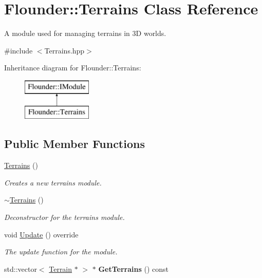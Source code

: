 \hypertarget{class_flounder_1_1_terrains}{}\section{Flounder\+:\+:Terrains Class Reference}
\label{class_flounder_1_1_terrains}


A module used for managing terrains in 3D worlds.  




{\ttfamily \#include $<$Terrains.\+hpp$>$}

Inheritance diagram for Flounder\+:\+:Terrains\+:\begin{figure}[H]
\begin{center}
\leavevmode
\includegraphics[height=2.000000cm]{class_flounder_1_1_terrains}
\end{center}
\end{figure}
\subsection*{Public Member Functions}
\begin{DoxyCompactItemize}
\item 
\hyperlink{class_flounder_1_1_terrains_a9b29646989e2c0888b29f501aad6a3cf}{Terrains} ()
\begin{DoxyCompactList}\small\item\em Creates a new terrains module. \end{DoxyCompactList}\item 
\hyperlink{class_flounder_1_1_terrains_a17bd0286821c4887893fd711ed3e9ddc}{$\sim$\+Terrains} ()
\begin{DoxyCompactList}\small\item\em Deconstructor for the terrains module. \end{DoxyCompactList}\item 
void \hyperlink{class_flounder_1_1_terrains_a6f6cd529efd3a88512da96f6c260689a}{Update} () override
\begin{DoxyCompactList}\small\item\em The update function for the module. \end{DoxyCompactList}\item 
\mbox{\label{class_flounder_1_1_terrains_a8ff904f212ef208ca02c7fc3ebd8212e}} 
std\+::vector$<$ \hyperlink{class_flounder_1_1_terrain}{Terrain} $\ast$ $>$ $\ast$ {\bfseries Get\+Terrains} () const
\end{DoxyCompactItemize}
